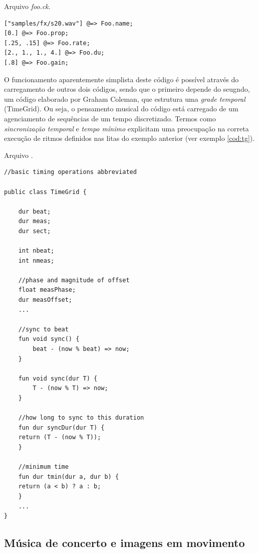 \begin{example}{Arquivo \emph{foo.ck}.}\label{cod:lookup}
\begin{verbatim}
["samples/fx/s20.wav"] @=> Foo.name;
[0.] @=> Foo.prop;
[.25, .15] @=> Foo.rate;
[2., 1., 1., 4.] @=> Foo.du;
[.8] @=> Foo.gain;
\end{verbatim}
\end{example}

O funcionamento aparentemente simplista deste código é possível através do carregamento de outros dois códigos, sendo que o primeiro depende do seugndo, um código elaborado por Graham Coleman, que estrutura uma \emph{grade temporal} (TimeGrid). Ou seja, o pensamento musical do código está carregado de um agenciamento de sequências de um tempo discretizado. Termos como \emph{sincronização temporal} e \emph{tempo mínimo} explicitam uma preocupação na correta execução de ritmos definidos nas litas do exemplo anterior (ver exemplo \ref{cod:tg}).

\begin{example}{Arquivo .}\label{cod:tg}
\begin{verbatim}
//basic timing operations abbreviated

public class TimeGrid {

    dur beat;
    dur meas;
    dur sect;

    int nbeat;
    int nmeas;

    //phase and magnitude of offset
    float measPhase;
    dur measOffset;
    ...

    //sync to beat
    fun void sync() {
        beat - (now % beat) => now;
    }

    fun void sync(dur T) {
        T - (now % T) => now;
    }

    //how long to sync to this duration
    fun dur syncDur(dur T) {
	return (T - (now % T));
    }

    //minimum time
    fun dur tmin(dur a, dur b) {
	return (a < b) ? a : b;
    }
    ...
}
\end{verbatim}  
\end{example}


\subsection{Música de concerto e imagens em movimento}\label{sec:concerto}

